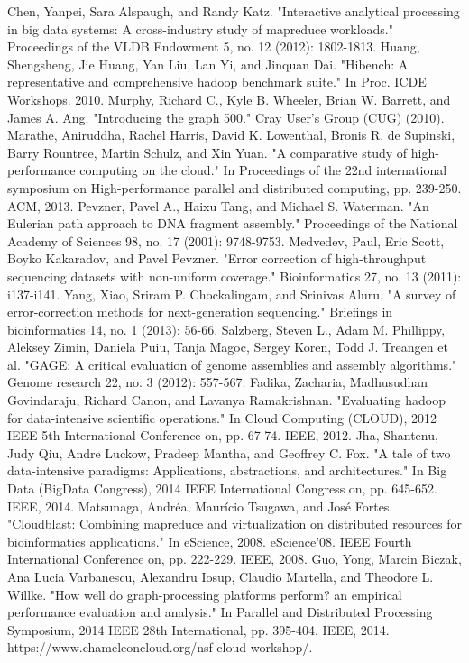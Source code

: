 \documentclass[conference]{IEEEtran}
\begin{document}
\begin{thebibliography}{1}
Chen, Yanpei, Sara Alspaugh, and Randy Katz. "Interactive analytical processing in big data systems: A cross-industry study of mapreduce workloads." Proceedings of the VLDB Endowment 5, no. 12 (2012): 1802-1813.
Huang, Shengsheng, Jie Huang, Yan Liu, Lan Yi, and Jinquan Dai. "Hibench: A representative and comprehensive hadoop benchmark suite." In Proc. ICDE Workshops. 2010.
Murphy, Richard C., Kyle B. Wheeler, Brian W. Barrett, and James A. Ang. "Introducing the graph 500." Cray User’s Group (CUG) (2010).
Marathe, Aniruddha, Rachel Harris, David K. Lowenthal, Bronis R. de Supinski, Barry Rountree, Martin Schulz, and Xin Yuan. "A comparative study of high-performance computing on the cloud." In Proceedings of the 22nd international symposium on High-performance parallel and distributed computing, pp. 239-250. ACM, 2013.
Pevzner, Pavel A., Haixu Tang, and Michael S. Waterman. "An Eulerian path approach to DNA fragment assembly." Proceedings of the National Academy of Sciences 98, no. 17 (2001): 9748-9753.
Medvedev, Paul, Eric Scott, Boyko Kakaradov, and Pavel Pevzner. "Error correction of high-throughput sequencing datasets with non-uniform coverage." Bioinformatics 27, no. 13 (2011): i137-i141.
Yang, Xiao, Sriram P. Chockalingam, and Srinivas Aluru. "A survey of error-correction methods for next-generation sequencing." Briefings in bioinformatics 14, no. 1 (2013): 56-66.
Salzberg, Steven L., Adam M. Phillippy, Aleksey Zimin, Daniela Puiu, Tanja Magoc, Sergey Koren, Todd J. Treangen et al. "GAGE: A critical evaluation of genome assemblies and assembly algorithms." Genome research 22, no. 3 (2012): 557-567.
Fadika, Zacharia, Madhusudhan Govindaraju, Richard Canon, and Lavanya Ramakrishnan. "Evaluating hadoop for data-intensive scientific operations." In Cloud Computing (CLOUD), 2012 IEEE 5th International Conference on, pp. 67-74. IEEE, 2012.
Jha, Shantenu, Judy Qiu, Andre Luckow, Pradeep Mantha, and Geoffrey C. Fox. "A tale of two data-intensive paradigms: Applications, abstractions, and architectures." In Big Data (BigData Congress), 2014 IEEE International Congress on, pp. 645-652. IEEE, 2014.
Matsunaga, Andréa, Maurício Tsugawa, and José Fortes. "Cloudblast: Combining mapreduce and virtualization on distributed resources for bioinformatics applications." In eScience, 2008. eScience'08. IEEE Fourth International Conference on, pp. 222-229. IEEE, 2008.
Guo, Yong, Marcin Biczak, Ana Lucia Varbanescu, Alexandru Iosup, Claudio Martella, and Theodore L. Willke. "How well do graph-processing platforms perform? an empirical performance evaluation and analysis." In Parallel and Distributed Processing Symposium, 2014 IEEE 28th International, pp. 395-404. IEEE, 2014.
https://www.chameleoncloud.org/nsf-cloud-workshop/.
\end{thebibliography}

\end{document}
